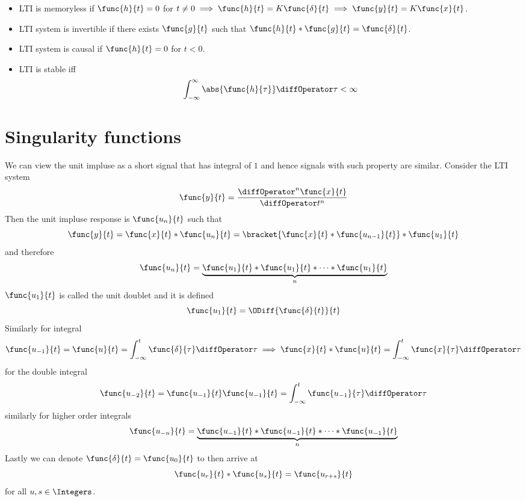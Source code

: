 \begin{itemize}
    \item LTI is memoryless if \(\func{h}{t} = 0\) for \(t \neq 0 \implies \func{h}{t} = K \func{\delta}{t} \implies \func{y}{t} = K \func{x}{t}\).
    \item LTI system is invertible if there exists \(\func{g}{t}\) such that \(\func{h}{t} \ast \func{g}{t} = \func{\delta}{t}\).
    \item LTI system is causal if \(\func{h}{t} = 0\) for \(t  < 0\).
    \item LTI is stable iff 
    \begin{equation*}
        \int_{-\infty}^{\infty} \abs{\func{h}{\tau}} \diffOperator \tau < \infty
    \end{equation*} 
\end{itemize}

\section{Singularity functions}
We can view the unit impluse as a short signal that has integral of \(1\) and hence signals with such property are similar. Consider the LTI system 
\begin{equation*}
    \func{y}{t} = \dfrac{\diffOperator^n \func{x}{t}}{\diffOperator t^n}
\end{equation*}
Then the unit impluse response is \(\func{u_n}{t}\) such that 
\begin{equation*}
    \func{y}{t} = \func{x}{t} \ast \func{u_n}{t} = \bracket{\func{x}{t} \ast \func{u_{n-1}}{t}} \ast \func{u_1}{t}
\end{equation*}
and therefore 
\begin{equation*}
    \func{u_n}{t} = \underbrace{\func{u_1}{t} \ast \func{u_1}{t} \ast \dots \ast \func{u_1}{t}}_n
\end{equation*}
\(\func{u_1}{t}\) is called the unit doublet and it is defined 
\begin{equation*}
   \func{u_1}{t} = \ODiff{\func{\delta}{t}}{t}
\end{equation*}
Similarly for integral 
\begin{equation*}
   \func{u_{-1}}{t} = \func{u}{t} = \int_{-\infty}^t \func{\delta}{\tau} \diffOperator \tau \implies \func{x}{t} \ast \func{u}{t} = \int_{-\infty}^t \func{x}{\tau} \diffOperator \tau
\end{equation*}
for the double integral 
\begin{equation*}
   \func{u_{-2}}{t} = \func{u_{-1}}{t}  \func{u_{-1}}{t} = \int_{-\infty}^t \func{u_{-1}}{\tau} \diffOperator \tau
\end{equation*}
similarly for higher order integrals 
\begin{equation*}
   \func{u_{-n}}{t} = \underbrace{\func{u_{-1}}{t} \ast \func{u_{-1}}{t} \ast \dots \ast \func{u_{-1}}{t}}_n
\end{equation*}
Lastly we can denote \(\func{\delta}{t} = \func{u_0}{t}\) to then arrive at 
\begin{equation*}
   \func{u_r}{t} \ast \func{u_s}{t} = \func{u_{r + s}}{t}
\end{equation*}
for all \(u,s \in \Integers\).